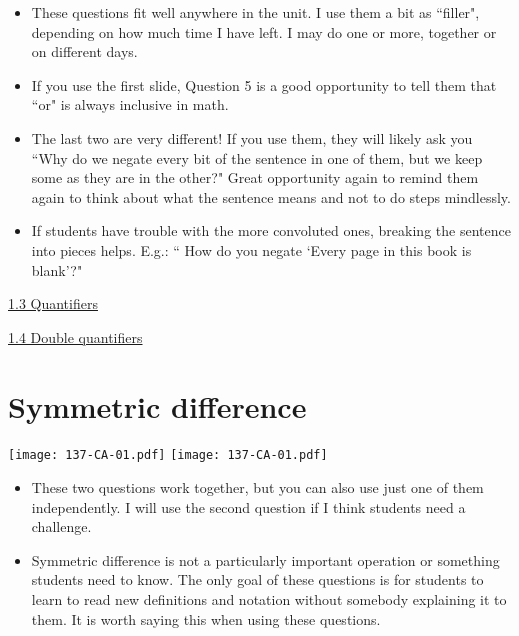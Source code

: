 \documentclass[11pt]{article}
\newcommand{\n}{\newpage}
\newcommand{\nl}{\hfill \vspace{-1.1\baselineskip}} %
\newcommand{\vthree}{\hspace{8mm}\href{https://www.youtube.com/watch?v=XHapWWI_wJ8&list=PLlwePzQY_wW-CPzhk-af-MXj9knthD1gx&index=3}{1.3 Quantifiers}}
\newcommand{\vfour}{\hspace{8mm}\href{https://www.youtube.com/watch?v=h1milgIk4U8&list=PLlwePzQY_wW-CPzhk-af-MXj9knthD1gx&index=4}{1.4 Double quantifiers}}
\begin{document}
\begin{comments}
\nl
	\begin{itemize}
		\item   These questions fit well anywhere in the unit. I use them a bit as ``filler", depending on how much time I have left.  I may do one or more, together or on different days.
		\item If you use the first slide, Question 5 is a good opportunity to tell them that ``or" is always inclusive in math.
		\item The last two are very different!  If you use them, they will likely ask you ``Why do we negate every bit of the sentence in one of them, but we keep some as they are in the other?"  Great opportunity again to remind them again to think about what the sentence means and not to do steps mindlessly.
		\item If students have trouble with the more convoluted ones, breaking the sentence into pieces helps.  E.g.: `` How do you negate `Every page in this book is blank'?"
	\end{itemize}
\end{comments}

\begin{videos}
\vthree

\vfour
\end{videos}
\n
\newpage
\section{Symmetric difference} 

\begin{center}
{ \texttt{[image: 137-CA-01.pdf]}} \quad
{ \texttt{[image: 137-CA-01.pdf]}}
\end{center}

\begin{comments}
\nl
\begin{itemize}
	\item  These two questions work together, but you can also use just one of them independently.   I will use the second question if I think students need a challenge.
	\item  Symmetric difference is not a particularly important operation or something students need to know.  The only goal of these questions is for students to learn to read new definitions and notation without somebody explaining it to them.  It is worth saying this when using these questions.
\end{itemize}
\end{comments}
\end{document}
